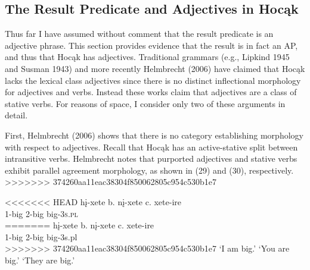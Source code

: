 \documentclass[output=paper]{LSP/langsci}
\begin{document}
\begin{exe}
\begin{exe}
\begin{exe}
\begin{exe}
{\begin{exe}
\section{The Result Predicate and Adjectives in Hoc\k{a}k} 

Thus far I have assumed without comment that the result predicate is an adjective phrase. This section provides evidence that the result is in fact an AP, and thus that Hoc\k{a}k has adjectives. Traditional grammars (e.g., Lipkind 1945 and Susman 1943) and more recently Helmbrecht (2006) have claimed that Hoc\k{a}k lacks the lexical class adjectives since there is no distinct inflectional morphology for adjectives and verbs. Instead these works claim that adjectives are a class of stative verbs. For reasons of space, I consider only two of these arguments in detail.

First, Helmbrecht (2006) shows that there is no category establishing morphology with respect to adjectives. Recall that Hoc\k{a}k has an active-stative split between intransitive verbs. Helmbrecht notes that purported adjectives and stative verbs exhibit parallel agreement morphology, as shown in (29) and (30), respectively.
>>>>>>> 374260aa11eac38304f850062805c954c530b1e7

\begin{exe}
\ex
\begin{xlist}
\ex \gll
<<<<<<< HEAD
hį-xete \hspace{36pt} b. {}  nį-xete \hspace{48pt} c. {} xete-ire\\
1-big {} {} {} 2-big {} {}  {} big-\textsc{3s.pl}\\
=======
h\k{i}-xete \hspace{36pt} b. {}  n\k{i}-xete \hspace{48pt} c. {} xete-ire\\
1-big {} {} {} 2-big {} {}  {} big-{\textsc 3s.pl}\\
>>>>>>> 374260aa11eac38304f850062805c954c530b1e7
\glt `I am big.' \hspace{1.2cm} `You are big.' \hspace{1.1cm} `They are big.'

\end{xlist}
\end{exe}


\end{exe}}
\end{exe}
\end{exe}
\end{exe}
\end{exe}
\end{document}
